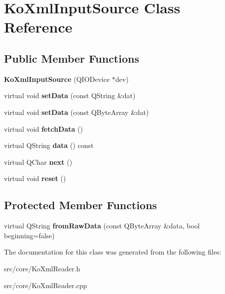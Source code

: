 \hypertarget{classKoXmlInputSource}{
\section{KoXmlInputSource Class Reference}
\label{classKoXmlInputSource}
}
\subsection*{Public Member Functions}
\begin{DoxyCompactItemize}
\item 
\hypertarget{classKoXmlInputSource_acdd63069dc8b540291ffaf989c54206b}{
{\bfseries KoXmlInputSource} (QIODevice $\ast$dev)}
\label{classKoXmlInputSource_acdd63069dc8b540291ffaf989c54206b}

\item 
\hypertarget{classKoXmlInputSource_ac3d81bb9052103d8d97386e21f45a5fb}{
virtual void {\bfseries setData} (const QString \&dat)}
\label{classKoXmlInputSource_ac3d81bb9052103d8d97386e21f45a5fb}

\item 
\hypertarget{classKoXmlInputSource_aad8026b1bb5e6eb46f24220b827b1870}{
virtual void {\bfseries setData} (const QByteArray \&dat)}
\label{classKoXmlInputSource_aad8026b1bb5e6eb46f24220b827b1870}

\item 
\hypertarget{classKoXmlInputSource_a2a3f23de221667b0e3426680d252cd3a}{
virtual void {\bfseries fetchData} ()}
\label{classKoXmlInputSource_a2a3f23de221667b0e3426680d252cd3a}

\item 
\hypertarget{classKoXmlInputSource_af2abb992609fe67b32747a43a1f9cc37}{
virtual QString {\bfseries data} () const }
\label{classKoXmlInputSource_af2abb992609fe67b32747a43a1f9cc37}

\item 
\hypertarget{classKoXmlInputSource_aa79acf53b93539868a2d8bbbb3162b6f}{
virtual QChar {\bfseries next} ()}
\label{classKoXmlInputSource_aa79acf53b93539868a2d8bbbb3162b6f}

\item 
\hypertarget{classKoXmlInputSource_a66eeb0565fa92ec078cb64ded1c20162}{
virtual void {\bfseries reset} ()}
\label{classKoXmlInputSource_a66eeb0565fa92ec078cb64ded1c20162}

\end{DoxyCompactItemize}
\subsection*{Protected Member Functions}
\begin{DoxyCompactItemize}
\item 
\hypertarget{classKoXmlInputSource_a64736ab8aefcbf2bb535dfcfceb91f24}{
virtual QString {\bfseries fromRawData} (const QByteArray \&data, bool beginning=false)}
\label{classKoXmlInputSource_a64736ab8aefcbf2bb535dfcfceb91f24}

\end{DoxyCompactItemize}


The documentation for this class was generated from the following files:\begin{DoxyCompactItemize}
\item 
src/core/KoXmlReader.h\item 
src/core/KoXmlReader.cpp\end{DoxyCompactItemize}
